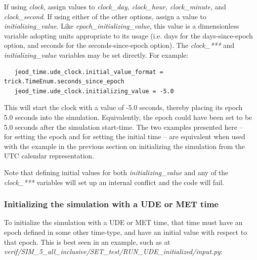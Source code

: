 If using \textit{clock}, assign values to \textit{clock\_day, clock\_hour,
clock\_minute,} and \textit{clock\_second}.  If using either of the other
options, assign a value to \textit{initializing\_value}.
Like \textit{epoch\_initializing\_value}, this value is a dimensionless
variable adopting units appropriate to its usage (i.e. days for the
days-since-epoch option, and seconds for the
seconds-since-epoch option).
The \textit{clock\_***} and \textit{initializing\_value} variables
may be set directly.  For example:
\begin{verbatim}
   jeod_time.ude_clock.initial_value_format = trick.TimeEnum.seconds_since_epoch
   jeod_time.ude_clock.initializing_value = -5.0
\end{verbatim}

This will start the clock with a value of -5.0 seconds, thereby placing its
epoch
5.0 seconds into the simulation.  Equivalently, the epoch could have been
set to be 5.0 seconds after the simulation start-time.  The two examples
presented here -- for setting the epoch and for setting the initial time --
are equivalent when used with the example in the previous section on
initializing the simulation from the UTC calendar representation.

Note that defining initial values for both \textit{initializing\_value} and
any of the \textit{clock\_***} variables will set up an internal conflict
and the code will fail.



\subsubsection{Initializing the simulation with a UDE or MET time}
To initialize the simulation with a UDE or MET time, that time must have
an epoch defined in some other time-type, and have an initial value with
respect to that epoch.  This is best seen in an example, such as at
\textit{verif/SIM\_5\_all\_inclusive/SET\_test/RUN\_UDE\_initialized/input.py}:


